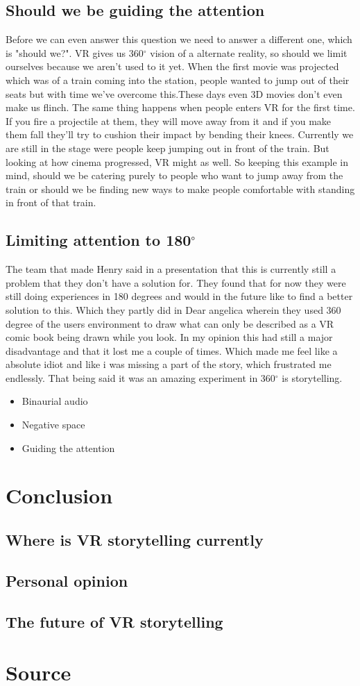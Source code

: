 \documentclass{report}
\begin{document}
				\section{Should we be guiding the attention}
				Before we can even answer this question we need to answer a different one, which is "should we?". VR gives us 360$^{\circ}$ vision of a alternate reality, so should we limit ourselves because we aren't used to it yet. When the first movie was projected which was of a train coming into the station, people wanted to jump out of their seats but with time we've overcome this.These days even 3D movies don't even make us flinch. The same thing happens when people enters VR for the first time. If you fire a projectile at them, they will move away from it and if you make them fall they'll try to cushion their impact by bending their knees. Currently we are still in the stage were people keep jumping out in front of the train. But looking at how cinema progressed, VR might as well. So keeping this example in mind, should we be catering purely to people who want to jump away from the train or should we be finding new ways to make people comfortable with standing in front of that train.
				
				\section{Limiting attention to 180$^{\circ}$}
				 The team that made Henry said in a presentation that this is currently still a problem that they don't have a solution for. They found that for now they were still doing experiences in 180 degrees and would in the future like to find a better solution to this. Which they partly did in Dear angelica wherein they used 360 degree of the users environment to draw what can only be described as a VR comic book being drawn while you look. In my opinion this had still a major disadvantage and that it lost me a couple of times. Which made me feel like a absolute idiot and like i was missing a part of the story, which frustrated me endlessly. That being said it was an amazing experiment in 360$^{\circ}$ is storytelling.
				
				\begin{itemize}
					\item Binaurial audio
					\item Negative space
					\item Guiding the attention
				\end{itemize}
				
				\chapter{Conclusion}
				\section{Where is VR storytelling currently}
				\section{Personal opinion}
				\section{The future of VR storytelling}
				\chapter{Source}
		
\end{document}
